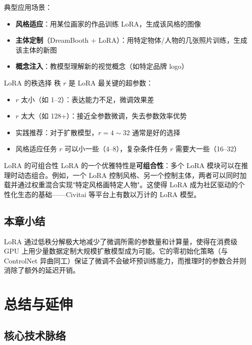 \documentclass[a4paper]{article}
\begin{document}
典型应用场景：
\begin{itemize}
    \item \textbf{风格适应}：用某位画家的作品训练 LoRA，生成该风格的图像
    \item \textbf{主体定制}（DreamBooth + LoRA）：用特定物体/人物的几张照片训练，生成该主体的新图
    \item \textbf{概念注入}：教模型理解新的视觉概念（如特定品牌 logo）
\end{itemize}

\begin{warningbox}{LoRA 的秩选择}
秩 $r$ 是 LoRA 最关键的超参数：
\begin{itemize}
    \item $r$ 太小（如 1--2）：表达能力不足，微调效果差
    \item $r$ 太大（如 128+）：接近全参数微调，失去参数效率优势
    \item 实践推荐：对于扩散模型，$r = 4 \sim 32$ 通常是好的选择
    \item 风格适应任务 $r$ 可以小一些（4--8），复杂条件任务 $r$ 需要大一些（16--32）
\end{itemize}
\end{warningbox}

\begin{knowledgebox}{LoRA 的可组合性}
LoRA 的一个优雅特性是\textbf{可组合性}：多个 LoRA 模块可以在推理时动态组合。例如，一个 LoRA 控制风格、另一个控制主体，两者可以同时加载并通过权重混合实现"特定风格画特定人物"。这使得 LoRA 成为社区驱动的个性化生态的基础——Civitai 等平台上有数以万计的 LoRA 模型。
\end{knowledgebox}

\subsection{本章小结}

LoRA 通过低秩分解极大地减少了微调所需的参数量和计算量，使得在消费级 GPU 上用少量数据定制大规模扩散模型成为可能。它的零初始化策略（与 ControlNet 异曲同工）保证了微调不会破坏预训练能力，而推理时的参数合并则消除了额外的延迟开销。

\newpage
\section{总结与延伸}

\subsection{核心技术脉络}
\end{document}
